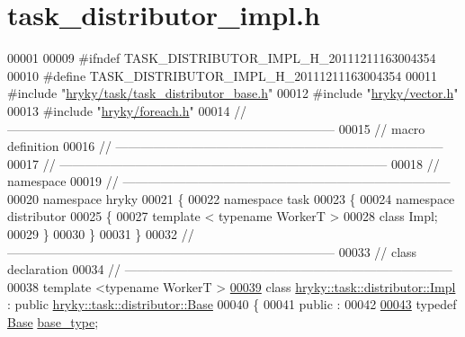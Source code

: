 \hypertarget{task__distributor__impl_8h_source}{\section{task\-\_\-distributor\-\_\-impl.\-h}
}

\begin{DoxyCode}
00001 
00009 \textcolor{preprocessor}{#ifndef TASK\_DISTRIBUTOR\_IMPL\_H\_20111211163004354}
00010 \textcolor{preprocessor}{}\textcolor{preprocessor}{#define TASK\_DISTRIBUTOR\_IMPL\_H\_20111211163004354}
00011 \textcolor{preprocessor}{}\textcolor{preprocessor}{#include "\hyperlink{task__distributor__base_8h}{hryky/task/task_distributor_base.h}"}
00012 \textcolor{preprocessor}{#include "\hyperlink{vector_8h}{hryky/vector.h}"}
00013 \textcolor{preprocessor}{#include "\hyperlink{foreach_8h}{hryky/foreach.h}"}
00014 \textcolor{comment}{//
      ------------------------------------------------------------------------------}
00015 \textcolor{comment}{// macro definition}
00016 \textcolor{comment}{//
      ------------------------------------------------------------------------------}
00017 \textcolor{comment}{//
      ------------------------------------------------------------------------------}
00018 \textcolor{comment}{// namespace}
00019 \textcolor{comment}{//
      ------------------------------------------------------------------------------}
00020 \textcolor{keyword}{namespace }hryky
00021 \{
00022 \textcolor{keyword}{namespace }task
00023 \{
00024 \textcolor{keyword}{namespace }distributor
00025 \{
00027     \textcolor{keyword}{template} < \textcolor{keyword}{typename} WorkerT >
00028     \textcolor{keyword}{class }Impl;
00029 \}
00030 \}
00031 \}
00032 \textcolor{comment}{//
      ------------------------------------------------------------------------------}
00033 \textcolor{comment}{// class declaration}
00034 \textcolor{comment}{//
      ------------------------------------------------------------------------------}
00038 \textcolor{comment}{}\textcolor{keyword}{template} <\textcolor{keyword}{typename} WorkerT >
\hypertarget{task__distributor__impl_8h_source_l00039}{}\hyperlink{classhryky_1_1task_1_1distributor_1_1_impl}{00039} \textcolor{keyword}{class }\hyperlink{classhryky_1_1task_1_1distributor_1_1_impl}{hryky::task::distributor::Impl} : \textcolor{keyword}{public} \hyperlink{classhryky_1_1task_1_1distributor_1_1_base}{hryky::task::distributor::Base}
00040 \{
00041 \textcolor{keyword}{public} :
00042 
\hypertarget{task__distributor__impl_8h_source_l00043}{}\hyperlink{classhryky_1_1task_1_1distributor_1_1_impl_a800b2a9aab8caca81adadd22b8be0648}{00043}     \textcolor{keyword}{typedef} \hyperlink{classhryky_1_1task_1_1distributor_1_1_base}{Base}                        \hyperlink{classhryky_1_1task_1_1distributor_1_1_impl_a800b2a9aab8caca81adadd22b8be0648}{base_type};

\end{DoxyCode}
